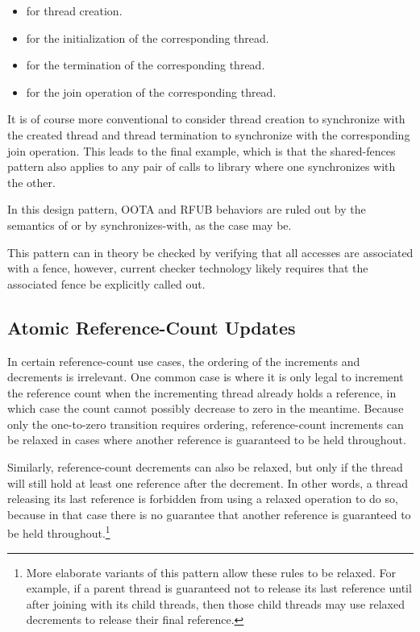 \documentclass[10]{article}
\begin{document}
\begin{itemize}
\item	{} for thread creation.
\item	{} for the initialization of the
	corresponding thread.
\item	{} for the termination of the
	corresponding thread.
\item	{} for the join operation
	of the corresponding thread.
\end{itemize}

It is of course more conventional to consider thread creation to
synchronize with the created thread and thread termination to synchronize
with the corresponding join operation.
This leads to the final example, which is that the shared-fences pattern
also applies to any pair of calls to library where one synchronizes with
the other.

In this design pattern, OOTA and RFUB behaviors are ruled out by the semantics
of  or by synchronizes-with, as the case may be.

This pattern can in theory be checked by verifying that all accesses
are associated with a fence, however, current checker technology likely
requires that the associated fence be explicitly called out.

\subsection{Atomic Reference-Count Updates}
\label{sec:Atomic Reference-Count Updates}

In certain reference-count use cases, the ordering of the increments and
decrements is irrelevant.
One common case is where it is only legal to increment the reference
count when the incrementing thread already holds a reference, in which
case the count cannot possibly decrease to zero in the meantime.
Because only the one-to-zero transition requires ordering, reference-count
increments can be relaxed in cases where another reference is guaranteed
to be held throughout.

Similarly, reference-count decrements can also be relaxed, but only if
the thread will still hold at least one reference after the decrement.
In other words, a thread releasing its last reference is forbidden
from using a relaxed operation to do so, because in that case there
is no guarantee that another reference is guaranteed to be held
throughout.\footnote{
	More elaborate variants of this pattern allow these rules to
	be relaxed.
	For example, if a parent thread is guaranteed not to release
	its last reference until after joining with its child threads,
	then those child threads may use relaxed decrements to release
	their final reference.}
\end{document}
